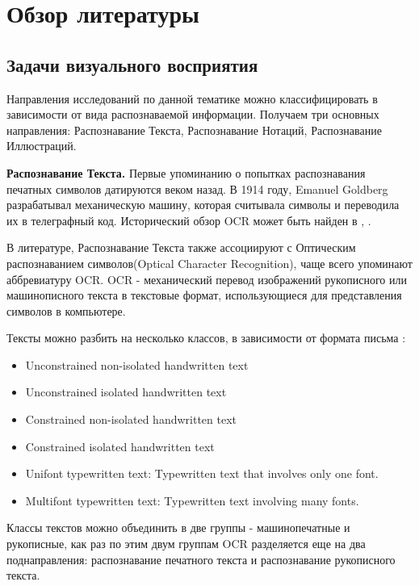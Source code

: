 \chapter{Обзор литературы} \label{chapt1}

\section{Задачи визуального восприятия} \label{sect1_1}

Направления исследований по данной тематике можно классифицировать в зависимости от вида распознаваемой информации. Получаем три основных направления: Распознавание Текста, Распознавание Нотаций, Распознавание Иллюстраций.

\textbf{Распознавание Текста.} Первые упоминанию о попытках распознавания печатных символов датируются веком назад. В 1914 году, Emanuel Goldberg разрабатывал механическую машину, которая считывала символы и переводила их в телеграфный код. Исторический обзор OCR может быть найден в \cite{mori1992historical}, \cite{herbert1982history}.

В литературе, Распознавание Текста также ассоциируют с Оптическим распознаванием символов(Optical Character Recognition), чаще всего упоминают аббревиатуру OCR. OCR - механический перевод изображений рукописного или машинописного текста в текстовые формат, использующиеся для представления символов в компьютере.

\noindent Тексты можно разбить на несколько классов, в зависимости от формата письма \cite{salunke2015state}:
\begin{itemize}
  \item Unconstrained non-isolated handwritten text
  \item Unconstrained isolated handwritten text
  \item Constrained non-isolated handwritten text
  \item Constrained isolated handwritten text
  \item Unifont typewritten text: Typewritten text that involves only one font.
  \item Multifont typewritten text: Typewritten text involving many fonts.
\end{itemize}

Классы текстов можно объединить в две группы - машинопечатные и рукописные, как раз по этим двум группам OCR разделяется еще на два поднаправления: распознавание печатного текста и распознавание рукописного текста.

